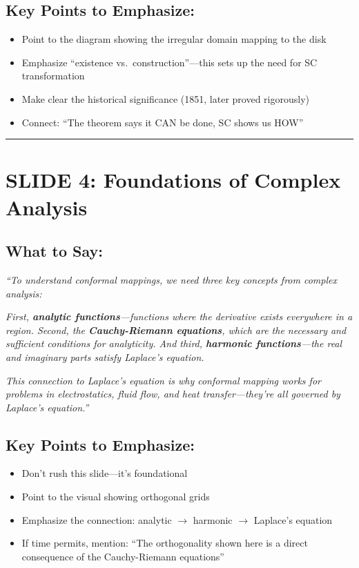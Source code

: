 \documentclass[12pt,a4paper]{article}
\begin{document}
\subsection*{Key Points to Emphasize:}
\begin{itemize}[leftmargin=*]
    \item Point to the diagram showing the irregular domain mapping to the disk
    \item Emphasize ``existence vs.\ construction''---this sets up the need for SC transformation
    \item Make clear the historical significance (1851, later proved rigorously)
    \item Connect: ``The theorem says it CAN be done, SC shows us HOW''
\end{itemize}

\vspace{10pt}
\hrule
\vspace{10pt}

\section*{SLIDE 4: Foundations of Complex Analysis}

\subsection*{What to Say:}
\begin{quotebox}
\textit{``To understand conformal mappings, we need three key concepts from complex analysis:}

\textit{First, \textbf{analytic functions}---functions where the derivative exists everywhere in a region. Second, the \textbf{Cauchy-Riemann equations}, which are the necessary and sufficient conditions for analyticity. And third, \textbf{harmonic functions}---the real and imaginary parts satisfy Laplace's equation.}

\textit{This connection to Laplace's equation is why conformal mapping works for problems in electrostatics, fluid flow, and heat transfer---they're all governed by Laplace's equation.''}
\end{quotebox}

\subsection*{Key Points to Emphasize:}
\begin{itemize}[leftmargin=*]
    \item Don't rush this slide---it's foundational
    \item Point to the visual showing orthogonal grids
    \item Emphasize the connection: analytic $\rightarrow$ harmonic $\rightarrow$ Laplace's equation
    \item If time permits, mention: ``The orthogonality shown here is a direct consequence of the Cauchy-Riemann equations''
\end{itemize}
\end{document}
